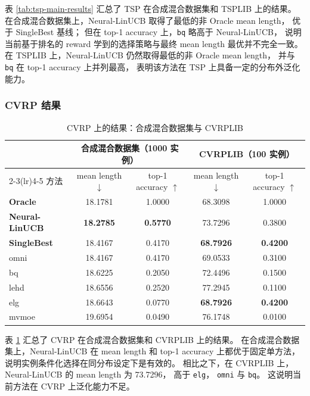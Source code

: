 表 \ref{tab:tsp-main-results} 汇总了 TSP 在合成混合数据集和 TSPLIB 上的结果。
在合成混合数据集上，Neural-LinUCB 取得了最低的非 Oracle mean length，
优于 SingleBest 基线；
但在 top-1 accuracy 上，\texttt{bq} 略高于 Neural-LinUCB，
说明当前基于排名的 reward 学到的选择策略与最终 mean length 最优并不完全一致。
在 TSPLIB 上，Neural-LinUCB 仍然取得最低的非 Oracle mean length，
并与 \texttt{bq} 在 top-1 accuracy 上并列最高，
表明该方法在 TSP 上具备一定的分布外泛化能力。

\subsubsection{CVRP 结果}

\begin{table}[htb]
  \centering
  \caption{CVRP 上的结果：合成混合数据集与 CVRPLIB}
  \label{tab:cvrp-main-results}
  \small
  \begin{tabular}{@{}p{4.5cm}cccc@{}}
    \toprule
    & \multicolumn{2}{c}{合成混合数据集（1000 实例）} & \multicolumn{2}{c}{CVRPLIB（100 实例）} \\
    \cmidrule(lr){2-3}\cmidrule(lr){4-5}
    方法 & mean length $\downarrow$ & top-1 accuracy $\uparrow$ & mean length $\downarrow$ & top-1 accuracy $\uparrow$ \\
    \midrule
    \textbf{Oracle} & 18.1781 & 1.0000 & 68.3098 & 1.0000 \\
    \textbf{Neural-LinUCB} & \textbf{18.2785} & \textbf{0.5770} & 73.7296 & 0.3800 \\
    \textbf{SingleBest} & 18.4167 & 0.4170 & \textbf{68.7926} & \textbf{0.4200} \\
    omni & 18.4167 & 0.4170 & 69.0533 & 0.3100 \\
    bq & 18.6225 & 0.2050 & 72.4496 & 0.1500 \\
    lehd & 18.6556 & 0.2520 & 77.2945 & 0.1100 \\
    elg & 18.6643 & 0.0770 & \textbf{68.7926} & \textbf{0.4200} \\
    mvmoe & 19.6954 & 0.0490 & 76.1748 & 0.0100 \\
    \bottomrule
  \end{tabular}
\end{table}

表 \ref{tab:cvrp-main-results} 汇总了 CVRP 在合成混合数据集和 CVRPLIB 上的结果。
在合成混合数据集上，Neural-LinUCB 在 mean length 和 top-1 accuracy 上都优于固定单方法，
说明实例条件化选择在同分布设定下是有效的。
相比之下，在 CVRPLIB 上，Neural-LinUCB 的 mean length 为 73.7296，
高于 \texttt{elg}， \texttt{omni} 与 \texttt{bq}。
这说明当前方法在 CVRP 上泛化能力不足。

